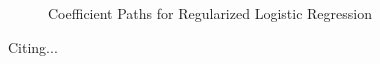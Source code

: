 \documentclass[]{article}
\begin{document}
\begin{figure}[!ht]
\centering
{}
\caption{Coefficient Paths for Regularized Logistic Regression}
\label{fig:Coeff_paths}
\end{figure}



Citing...
\cite{ratinov2009design}



\end{document}
